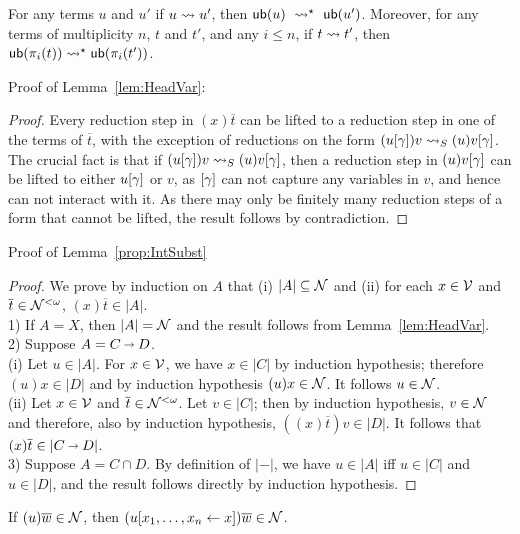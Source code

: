 \documentclass[orivec]{llncs}
\begin{document}
\begin{ALlemma}
\label{lem:lift-sn}
For any terms $u$ and $u'$ if $u\rewrite u'$, then $\sn(u)
~\rewrite^\star~ \sn(u')$. Moreover, for any terms of multiplicity
$n$, $t$ and $t'$, and any $i\leq n$, if $t\rewrite t'$, then
$\sn(\pi_i(t))\rewrite^\star\sn(\pi_i(t'))$.
\end{ALlemma}


Proof of Lemma~\ref{lem:HeadVar}:

\begin{proof}
Every reduction step in $(x)\overline{t}$ can be lifted to a reduction
step in one of the terms of $\overline{t}$, with the exception of
reductions on the form $(u\g)v\ALnotbeta(u)v\g$. The crucial fact is
that if $(u\g)v\ALnotbeta(u)v\g$, then a reduction step in $(u)v\g$
can be lifted to either $u\g$ or $v$, as $\g$ can not capture any
variables in $v$, and hence can not interact with it.
%
As there may only be finitely many reduction steps of a form that
cannot be lifted, the result follows by contradiction.
\end{proof}

Proof of Lemma~\ref{prop:IntSubst}

\begin{proof}
We prove by induction on $A$ that (i) $ |A| \subseteq  \mathcal{N}$ and (ii) for each $x\in \mathcal{V}$ and $\overline{t} \in \mathcal{N}^{<\omega}$, $(x)\overline{t} \in |A|$.
\\
1) If $A=X$, then $|A| =\mathcal{N}$ and the result follows from Lemma~\ref{lem:HeadVar}.
\\
2) Suppose $A=C\vlim D$.
\\
(i) Let $u \in |A|$. For $x \in \mathcal{V}$, we have $x\in |C|$ by induction hypothesis; therefore $(u)x \in |D|$ and by induction hypothesis $(u)x \in \mathcal{N}$. It follows  $u \in \mathcal{N}$.
\\
(ii) Let $x\in \mathcal{V}$ and $\overline{t} \in \mathcal{N}^{<\omega}$. Let $v\in |C|$; then by induction hypothesis,  $v\in \mathcal{N}$ and therefore, also by induction hypothesis, $((x)\overline{t})v \in |D|$. It follows that $(x)\overline{t} \in |C \vlim D|$.
\\
3) Suppose $A=C \cap D$. By definition of $|-|$, we have $u\in |A|$ iff $u\in |C|$ and $u\in |D|$, and the result follows directly by induction hypothesis.
\end{proof}

\begin{ALlemma}\label{lem:SN-AddSharings}
If $(u)\overline{w} \in \mathcal{N}$, then $(u\share xx)\overline{w} \in \SN$.
\end{ALlemma}
\end{document}
